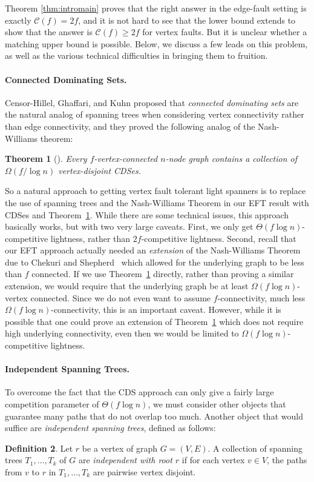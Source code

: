 \documentclass{article}
\theoremstyle{plain}
\newtheorem{theorem}{Theorem}
\theoremstyle{definition}
\newtheorem{definition}[theorem]{Definition}
\begin{document}
Theorem \ref{thm:intromain} proves that the right answer in the edge-fault setting is exactly $\mathcal{C}(f) = 2f$, and it is not hard to see that the lower bound extends to show that the answer is $\mathcal{C}(f) \ge 2f$ for vertex faults.  But it is unclear whether a matching upper bound is possible.
Below, we discuss a few leads on this problem, as well as the various technical difficulties in bringing them to fruition.

\paragraph{Connected Dominating Sets.} 
Censor-Hillel, Ghaffari, and Kuhn \cite{CGK14} proposed that \emph{connected dominating sets} are the natural analog of spanning trees when considering vertex connectivity rather than edge connectivity, and they proved the following analog of the Nash-Williams theorem:
\begin{theorem} [\cite{CGK14}] \label{thm:CDS}
Every $f$-vertex-connected $n$-node graph contains a collection of $\Omega(f / \log n)$ vertex-disjoint CDSes.
\end{theorem}

So a natural approach to getting vertex fault tolerant light spanners is to replace the use of spanning trees and the Nash-Williams Theorem in our EFT result with CDSes and Theorem~\ref{thm:CDS}.  While there are some technical issues, this approach basically works, but with two very large caveats.  First, we only get $\Theta(f \log n)$-competitive lightness, rather than $2f$-competitive lightness.  Second, recall that our EFT approach actually needed an \emph{extension} of the Nash-Williams Theorem due to Chekuri and Shepherd~\cite{chekuri2009approximate} which allowed for the underlying graph to be less than $f$ connected.  If we use Theorem~\ref{thm:CDS} directly, rather than proving a similar extension, we would require that the underlying graph be at least $\Omega(f \log n)$-vertex connected.  Since we do not even want to assume $f$-connectivity, much less $\Omega(f \log n)$-connectivity, this is an important caveat.  However, while it is possible that one could prove an extension of Theorem~\ref{thm:CDS} which does not require high underlying connectivity, even then we would be limited to $\Omega(f \log n)$-competitive lightness.

\paragraph{Independent Spanning Trees.}
To overcome the fact that the CDS approach can only give a fairly large competition parameter of $\Theta(f \log n)$, we must consider other objects that guarantee many paths that do not overlap too much. 
Another object that would suffice are \textit{independent spanning trees}, defined as follows:
\begin{definition}
    Let $r$ be a vertex of graph $G = (V,E)$. A collection of spanning trees $T_1, \dots, T_k$ of $G$ are \textit{independent with root $r$} if for each vertex $v \in V$, the paths from $v$ to $r$ in $T_1, \dots, T_k$ are pairwise vertex disjoint.
\end{definition}
\end{document}
